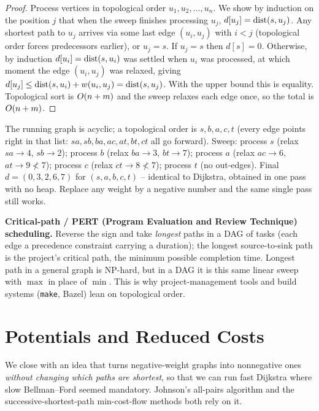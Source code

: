 \begin{proof}
Process vertices in topological order $u_1,u_2,\dots,u_n$. We show by induction on the
position $j$ that when the sweep finishes processing $u_j$, $d[u_j]=\operatorname{dist}(s,u_j)$. Any
shortest path to $u_j$ arrives via some last edge $(u_i,u_j)$ with $i<j$ (topological order
forces predecessors earlier), or $u_j=s$. If $u_j=s$ then $d[s]=0$. Otherwise, by induction
$d[u_i]=\operatorname{dist}(s,u_i)$ was settled when $u_i$ was processed, at which moment the edge
$(u_i,u_j)$ was relaxed, giving $d[u_j]\le \operatorname{dist}(s,u_i)+w(u_i,u_j)=\operatorname{dist}(s,u_j)$. With the
upper bound this is equality. Topological sort is $O(n+m)$ and the sweep relaxes each edge
once, so the total is $O(n+m)$.
\end{proof}

\begin{labbox}
The running graph is acyclic; a topological order is $s,b,a,c,t$ (every edge points right in
that list: $sa,sb,ba,ac,at,bt,ct$ all go forward). Sweep: process $s$ (relax $sa\!\to\!4$,
$sb\!\to\!2$); process $b$ (relax $ba\!\to\!3$, $bt\!\to\!7$); process $a$
(relax $ac\!\to\!6$, $at\!\to\!9\!\not<\!7$); process $c$
(relax $ct\!\to\!8\!\not<\!7$); process $t$ (no out-edges). Final
$d=(0,3,2,6,7)$ for $(s,a,b,c,t)$ -- identical to Dijkstra, obtained in one pass with no
heap. Replace any weight by a negative number and the same single pass still works.
\end{labbox}

\begin{applicationbox}
\textbf{Critical-path / PERT (Program Evaluation and Review Technique) scheduling.} Reverse the sign and take \emph{longest} paths in
a DAG of tasks (each edge a precedence constraint carrying a duration); the longest
source-to-sink path is the project's critical path, the minimum possible completion time.
Longest path in a general graph is NP-hard, but in a DAG it is this same linear sweep with
$\max$ in place of $\min$. This is why project-management tools and build systems
(\texttt{make}, Bazel) lean on topological order.
\end{applicationbox}

\section{Potentials and Reduced Costs}
\label{ch07:potentials}

We close with an idea that turns negative-weight graphs into nonnegative ones \emph{without
changing which paths are shortest}, so that we can run fast Dijkstra where slow Bellman--Ford
seemed mandatory. Johnson's all-pairs algorithm and the successive-shortest-path
min-cost-flow methods both rely on it.

